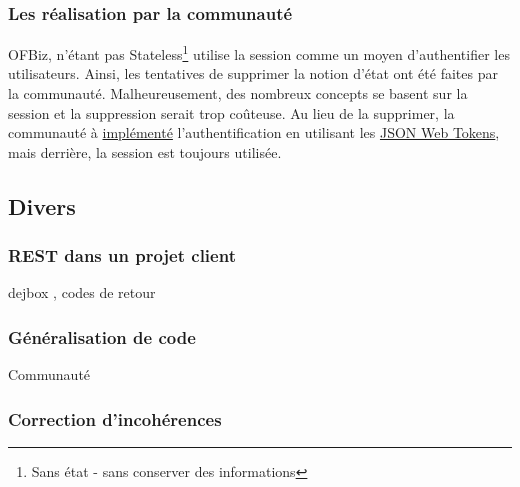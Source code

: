 \subsubsection{Les réalisation par la communauté}
OFBiz, n'étant pas Stateless\footnote{Sans état - sans conserver des informations} utilise la session comme un moyen d'authentifier les utilisateurs. Ainsi, les tentatives de supprimer la notion d'état ont été faites par la communauté. Malheureusement, des nombreux concepts se basent sur la  session et la suppression serait trop coûteuse. Au lieu de la supprimer, la communauté à \href{https://issues.apache.org/jira/browse/OFBIZ-9833}{implémenté} l'authentification en utilisant les \href{https://jwt.io/introduction/}{JSON Web Tokens}, mais derrière, la session est toujours utilisée.
\subsection{Divers}
\subsubsection{REST dans un projet client}
dejbox , codes de retour

\subsubsection{Généralisation de code}
Communauté
\subsubsection{Correction d'incohérences}


